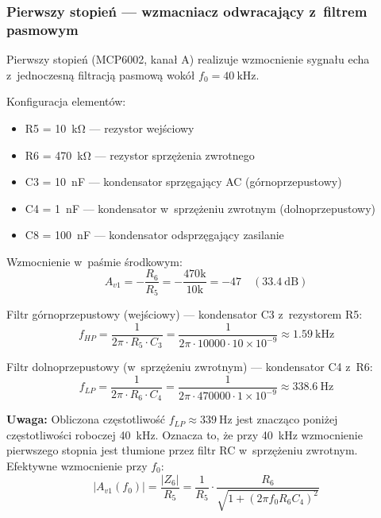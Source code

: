 \documentclass[a4paper,11pt]{article}
\begin{document}
\subsubsection{Pierwszy stopień --- wzmacniacz odwracający z~filtrem pasmowym}

Pierwszy stopień (MCP6002, kanał A) realizuje wzmocnienie sygnału echa
z~jednoczesną filtracją pasmową wokół $f_0 = \SI{40}{\kilo\hertz}$.

Konfiguracja elementów:
\begin{itemize}[nosep]
    \item R5 = \SI{10}{\kilo\ohm} --- rezystor wejściowy
    \item R6 = \SI{470}{\kilo\ohm} --- rezystor sprzężenia zwrotnego
    \item C3 = \SI{10}{\nano\farad} --- kondensator sprzęgający AC (górnoprzepustowy)
    \item C4 = \SI{1}{\nano\farad} --- kondensator w~sprzężeniu zwrotnym (dolnoprzepustowy)
    \item C8 = \SI{100}{\nano\farad} --- kondensator odsprzęgający zasilanie
\end{itemize}

Wzmocnienie w~paśmie środkowym:
\begin{equation}
    A_{v1} = -\frac{R_6}{R_5} = -\frac{470\text{k}}{10\text{k}} = -47 \quad (\SI{33,4}{\deci\bel})
    \label{eq:gain1}
\end{equation}

Filtr górnoprzepustowy (wejściowy) --- kondensator C3 z~rezystorem R5:
\begin{equation}
    f_{HP} = \frac{1}{2\pi \cdot R_5 \cdot C_3} = \frac{1}{2\pi \cdot 10000 \cdot 10 \times 10^{-9}} \approx \SI{1,59}{\kilo\hertz}
    \label{eq:fhp}
\end{equation}

Filtr dolnoprzepustowy (w~sprzężeniu zwrotnym) --- kondensator C4 z~R6:
\begin{equation}
    f_{LP} = \frac{1}{2\pi \cdot R_6 \cdot C_4} = \frac{1}{2\pi \cdot 470000 \cdot 1 \times 10^{-9}} \approx \SI{338,6}{\hertz}
    \label{eq:flp_raw}
\end{equation}

\textbf{Uwaga:} Obliczona częstotliwość $f_{LP} \approx \SI{339}{\hertz}$ jest
znacząco poniżej częstotliwości roboczej \SI{40}{\kilo\hertz}. Oznacza to, że
przy \SI{40}{\kilo\hertz} wzmocnienie pierwszego stopnia jest tłumione przez
filtr RC w~sprzężeniu zwrotnym. Efektywne wzmocnienie przy $f_0$:
\begin{equation}
    |A_{v1}(f_0)| = \frac{|Z_6|}{R_5} = \frac{1}{R_5} \cdot \frac{R_6}{\sqrt{1 + (2\pi f_0 R_6 C_4)^2}}
    \label{eq:gain1_f0}
\end{equation}
\end{document}
